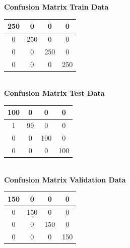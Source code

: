 \documentclass{article}
\begin{document}
\begin{flushleft}
\textbf{Confusion Matrix Train Data\\[5pt]}
\begin{tabular}{|c|c|c|c|}
\hline
250 & 0 & 0 & 0 \\
\hline
0 & 250 & 0 & 0 \\
\hline
0 & 0 & 250 & 0 \\
\hline
0 & 0 & 0 & 250 \\
\hline
\end{tabular}
\textbf{\\[10pt] Confusion Matrix Test Data \\[5pt]}
\begin{tabular}{|c|c|c|c|}
\hline
100 & 0 & 0 & 0 \\
\hline
1 & 99 & 0 & 0 \\
\hline
0 & 0 & 100 & 0 \\
\hline
0 & 0 & 0 & 100 \\
\hline
\end{tabular}
\textbf{\\[10pt] Confusion Matrix Validation Data \\[5pt]}
\begin{tabular}{|c|c|c|c|}
\hline
150 & 0 & 0 & 0 \\
\hline
0 & 150 & 0 & 0 \\
\hline
0 & 0 & 150 & 0 \\
\hline
0 & 0 & 0 & 150 \\
\hline
\end{tabular}
\end{flushleft}
\end{document}
